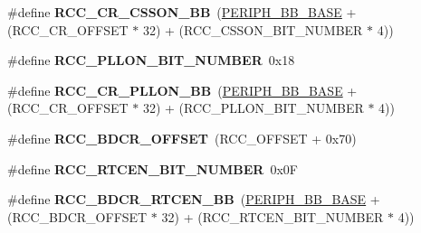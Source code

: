 \begin{DoxyCompactItemize}
\item 
\#define {\bfseries R\+C\+C\+\_\+\+C\+R\+\_\+\+C\+S\+S\+O\+N\+\_\+\+BB}~(\hyperlink{group___peripheral__memory__map_gaed7efc100877000845c236ccdc9e144a}{P\+E\+R\+I\+P\+H\+\_\+\+B\+B\+\_\+\+B\+A\+SE} + (R\+C\+C\+\_\+\+C\+R\+\_\+\+O\+F\+F\+S\+ET $\ast$ 32) + (R\+C\+C\+\_\+\+C\+S\+S\+O\+N\+\_\+\+B\+I\+T\+\_\+\+N\+U\+M\+B\+ER $\ast$ 4))\hypertarget{group___r_c_c___bit_address___alias_region_ga37c353c62ad303e661e99f20dcc6d1f0}{}\label{group___r_c_c___bit_address___alias_region_ga37c353c62ad303e661e99f20dcc6d1f0}

\item 
\#define {\bfseries R\+C\+C\+\_\+\+P\+L\+L\+O\+N\+\_\+\+B\+I\+T\+\_\+\+N\+U\+M\+B\+ER}~0x18\hypertarget{group___r_c_c___bit_address___alias_region_gaed4c77e51cc821b9645cb7874bf5861b}{}\label{group___r_c_c___bit_address___alias_region_gaed4c77e51cc821b9645cb7874bf5861b}

\item 
\#define {\bfseries R\+C\+C\+\_\+\+C\+R\+\_\+\+P\+L\+L\+O\+N\+\_\+\+BB}~(\hyperlink{group___peripheral__memory__map_gaed7efc100877000845c236ccdc9e144a}{P\+E\+R\+I\+P\+H\+\_\+\+B\+B\+\_\+\+B\+A\+SE} + (R\+C\+C\+\_\+\+C\+R\+\_\+\+O\+F\+F\+S\+ET $\ast$ 32) + (R\+C\+C\+\_\+\+P\+L\+L\+O\+N\+\_\+\+B\+I\+T\+\_\+\+N\+U\+M\+B\+ER $\ast$ 4))\hypertarget{group___r_c_c___bit_address___alias_region_ga0b0a8f171b66cc0d767716ba23ad3c6f}{}\label{group___r_c_c___bit_address___alias_region_ga0b0a8f171b66cc0d767716ba23ad3c6f}

\item 
\#define {\bfseries R\+C\+C\+\_\+\+B\+D\+C\+R\+\_\+\+O\+F\+F\+S\+ET}~(R\+C\+C\+\_\+\+O\+F\+F\+S\+ET + 0x70)\hypertarget{group___r_c_c___bit_address___alias_region_gaf234fe5d9628a3f0769721e76f83c566}{}\label{group___r_c_c___bit_address___alias_region_gaf234fe5d9628a3f0769721e76f83c566}

\item 
\#define {\bfseries R\+C\+C\+\_\+\+R\+T\+C\+E\+N\+\_\+\+B\+I\+T\+\_\+\+N\+U\+M\+B\+ER}~0x0F\hypertarget{group___r_c_c___bit_address___alias_region_gac4074d20c157f0892c6effb8bf22c8d7}{}\label{group___r_c_c___bit_address___alias_region_gac4074d20c157f0892c6effb8bf22c8d7}

\item 
\#define {\bfseries R\+C\+C\+\_\+\+B\+D\+C\+R\+\_\+\+R\+T\+C\+E\+N\+\_\+\+BB}~(\hyperlink{group___peripheral__memory__map_gaed7efc100877000845c236ccdc9e144a}{P\+E\+R\+I\+P\+H\+\_\+\+B\+B\+\_\+\+B\+A\+SE} + (R\+C\+C\+\_\+\+B\+D\+C\+R\+\_\+\+O\+F\+F\+S\+ET $\ast$ 32) + (R\+C\+C\+\_\+\+R\+T\+C\+E\+N\+\_\+\+B\+I\+T\+\_\+\+N\+U\+M\+B\+ER $\ast$ 4))\hypertarget{group___r_c_c___bit_address___alias_region_ga583ba8653153b48a06473d0a331f781d}{}\label{group___r_c_c___bit_address___alias_region_ga583ba8653153b48a06473d0a331f781d}


\end{DoxyCompactItemize}
